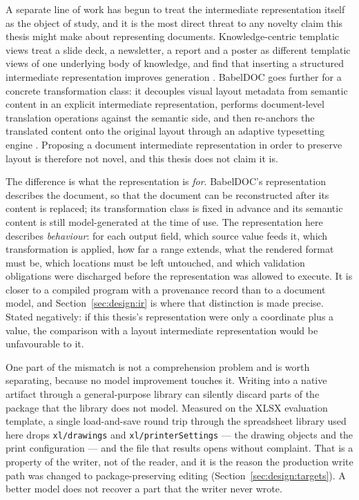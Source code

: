 A separate line of work has begun to treat the intermediate representation itself as the
object of study, and it is the most direct threat to any novelty claim this thesis might make
about representing documents. Knowledge-centric templatic views treat a slide deck, a
newsletter, a report and a poster as different templatic views of one underlying body of
knowledge, and find that inserting a structured intermediate representation improves generation
\cite{cachola2024templaticviews}. BabelDOC goes further for a concrete transformation class: it
decouples visual layout metadata from semantic content in an explicit intermediate
representation, performs document-level translation operations against the semantic side, and
then re-anchors the translated content onto the original layout through an adaptive typesetting
engine \cite{yang2026babeldoc}. Proposing a document intermediate representation in order to
preserve layout is therefore not novel, and this thesis does not claim it is.

The difference is what the representation is \emph{for}. BabelDOC's representation describes the
document, so that the document can be reconstructed after its content is replaced; its
transformation class is fixed in advance and its semantic content is still model-generated at
the time of use. The representation here describes \emph{behaviour}: for each output field, which
source value feeds it, which transformation is applied, how far a range extends, what the
rendered format must be, which locations must be left untouched, and which validation
obligations were discharged before the representation was allowed to execute. It is closer to a
compiled program with a provenance record than to a document model, and
Section~\ref{sec:design:ir} is where that distinction is made precise. Stated negatively: if
this thesis's representation were only a coordinate plus a value, the comparison with a layout
intermediate representation would be unfavourable to it.

One part of the mismatch is not a comprehension problem and is worth separating, because no
model improvement touches it. Writing into a native artifact through a general-purpose library
can silently discard parts of the package that the library does not model. Measured on the
XLSX evaluation template, a single load-and-save round trip through the spreadsheet library
used here drops \texttt{xl/drawings} and \texttt{xl/printerSettings} --- the drawing objects and
the print configuration --- and the file that results opens without complaint. That is a
property of the writer, not of the reader, and it is the reason the production write path was
changed to package-preserving editing (Section~\ref{sec:design:targets}). A better model does
not recover a part that the writer never wrote.

